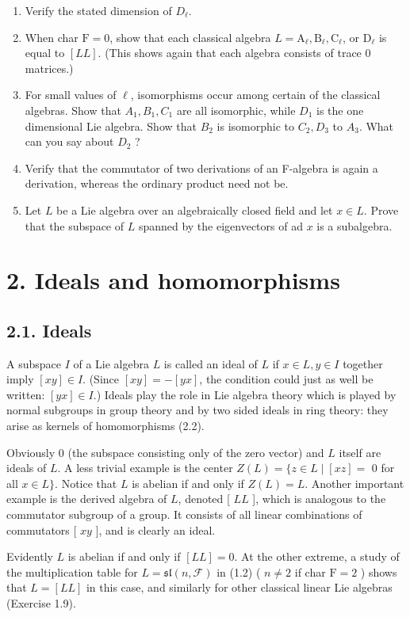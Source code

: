 \documentclass[10pt]{article}
\begin{document}
\begin{enumerate}
  \item Verify the stated dimension of $D_{\ell}$.
  \item When char $\mathrm{F}=0$, show that each classical algebra $L=\mathrm{A}_{\ell}, \mathrm{B}_{\ell}, \mathrm{C}_{\ell}$, or $\mathrm{D}_{\ell}$ is equal to $[L L]$. (This shows again that each algebra consists of trace 0 matrices.)
  \item For small values of $\ell$, isomorphisms occur among certain of the classical algebras. Show that $A_{1}, B_{1}, C_{1}$ are all isomorphic, while $D_{1}$ is the one dimensional Lie algebra. Show that $B_{2}$ is isomorphic to $C_{2}, D_{3}$ to $A_{3}$. What can you say about $D_{2}$ ?
  \item Verify that the commutator of two derivations of an F-algebra is again a derivation, whereas the ordinary product need not be.
  \item Let $L$ be a Lie algebra over an algebraically closed field and let $x \in L$. Prove that the subspace of $L$ spanned by the eigenvectors of ad $x$ is a subalgebra.
\end{enumerate}

\section*{2. Ideals and homomorphisms}
\subsection*{2.1. Ideals}
A subspace $I$ of a Lie algebra $L$ is called an ideal of $L$ if $x \in L, y \in I$ together imply $[x y] \in I$. (Since $[x y]=-[y x]$, the condition could just as well be written: $[y x] \in I$.) Ideals play the role in Lie algebra theory which is played by normal subgroups in group theory and by two sided ideals in ring theory: they arise as kernels of homomorphisms (2.2).

Obviously 0 (the subspace consisting only of the zero vector) and $L$ itself are ideals of $L$. A less trivial example is the center $Z(L)=\{z \in L \mid[x z]=$ 0 for all $x \in L\}$. Notice that $L$ is abelian if and only if $Z(L)=L$. Another important example is the derived algebra of $L$, denoted [ $L L$ ], which is analogous to the commutator subgroup of a group. It consists of all linear combinations of commutators [ $x y$ ], and is clearly an ideal.

Evidently $L$ is abelian if and only if $[L L]=0$. At the other extreme, a study of the multiplication table for $L=\mathfrak{s l}(n, \mathcal{F})$ in (1.2) ( $n \neq 2$ if char $\mathrm{F}=2$ ) shows that $L=[L L]$ in this case, and similarly for other classical linear Lie algebras (Exercise 1.9).
\end{document}
